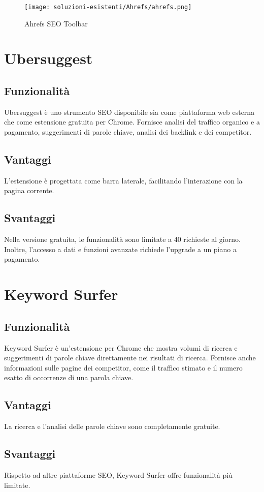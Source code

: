 \begin{figure}[H]
    \centering 
    \texttt{[image: soluzioni-esistenti/Ahrefs/ahrefs.png]} 
    \caption{Ahrefs SEO Toolbar}
\end{figure}

\section{Ubersuggest}

\subsection{Funzionalità}
\par Ubersuggest è uno strumento SEO disponibile sia come piattaforma web esterna che come estensione gratuita per Chrome. Fornisce analisi del traffico organico e a pagamento, suggerimenti di parole chiave, analisi dei backlink e dei competitor.

\subsection{Vantaggi}
\par L'estensione è progettata come barra laterale, facilitando l'interazione con la pagina corrente.

\subsection{Svantaggi}
\par Nella versione gratuita, le funzionalità sono limitate a 40 richieste al giorno. Inoltre, l'accesso a dati e funzioni avanzate richiede l'upgrade a un piano a pagamento.

\section{Keyword Surfer}

\subsection{Funzionalità}
\par Keyword Surfer è un’estensione per Chrome che mostra volumi di ricerca e suggerimenti di parole chiave direttamente nei risultati di ricerca. Fornisce anche informazioni sulle pagine dei competitor, come il traffico stimato e il numero esatto di occorrenze di una parola chiave.

\subsection{Vantaggi}
\par La ricerca e l'analisi delle parole chiave sono completamente gratuite.

\subsection{Svantaggi}
\par Rispetto ad altre piattaforme SEO, Keyword Surfer offre funzionalità più limitate.